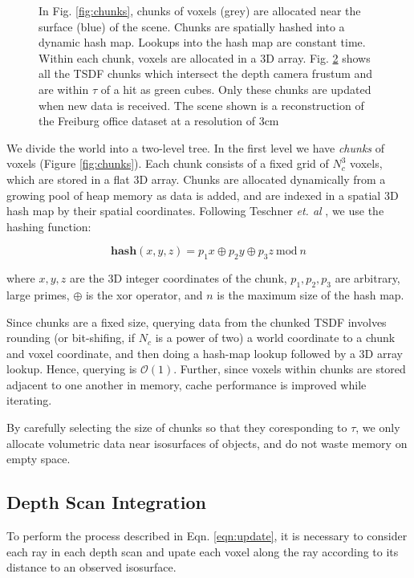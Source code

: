 \begin{figure}
\begin{subfigure}{0.48\columnwidth}
      \caption{}
 	 \label{fig:frustum_cull}
  \end{subfigure}
  \caption{In Fig. \ref{fig:chunks}, chunks of voxels (grey) are allocated near
  the surface (blue) of the scene. Chunks are spatially hashed \cite{SpatialHashing} into a
      dynamic hash map. Lookups into the hash map are constant time. Within each
      chunk, voxels are allocated in a 3D array. Fig.
      \ref{fig:frustum_cull} shows all the TSDF chunks which intersect the depth
      camera frustum  and are within $\tau$ of a hit as green cubes. Only these
      chunks are updated when new data is received. The scene shown is a
      reconstruction of the Freiburg office \cite{FREIBURG} dataset at a
      resolution of 3cm}
\end{figure} 

We divide the world into a two-level tree. In the first level we have
\emph{chunks} of voxels (Figure \ref{fig:chunks}). Each chunk consists of a
fixed grid of $N_c^3$ voxels, which are stored in a flat 3D array. Chunks are
allocated dynamically from a growing pool of heap memory as data is added, and
are indexed in a spatial 3D hash map \cite{SpatialHashing} by their spatial
coordinates. Following Teschner \emph{et. al} \cite{SpatialHashing}, we use the
hashing function:

\begin{equation}
\textbf{hash}(x, y, z) = p_1 x\oplus p_2 y \oplus p_3 z
~\text{mod}~n
\end{equation}

\noindent where $x, y, z$ are the 3D integer coordinates of the chunk, $p_1,
p_2, p_3$ are arbitrary, large primes, $\oplus$ is the xor operator, and $n$ is
the maximum size of the hash map.

Since chunks are a fixed size, querying data from the chunked TSDF involves
rounding (or bit-shifing, if $N_c$ is a power of two) a world coordinate to a
chunk and voxel coordinate, and then doing a hash-map lookup followed by a 3D
array lookup. Hence, querying is $\mathcal{O}(1)$. Further, since voxels within
chunks are stored adjacent to one another in memory, cache performance is
improved while iterating.

By carefully selecting the size of chunks so that they coresponding to $\tau$,
we only allocate volumetric data near isosurfaces of objects, and do not waste
memory on empty space.

\subsection{Depth Scan Integration}
\label{section:scan_integration}
To perform the process described in Eqn. \ref{eqn:update}, it is necessary
to consider each ray in each depth scan and upate each voxel
along the ray according to its distance to an observed isosurface.

